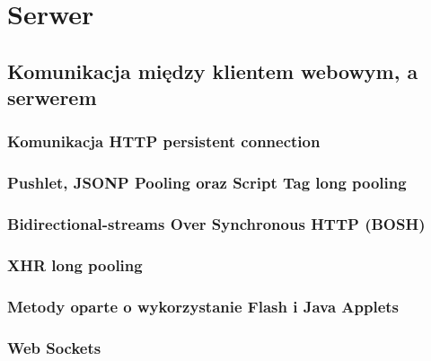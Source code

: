 \section{Serwer}


\subsection{Komunikacja między klientem webowym, a serwerem}


\subsubsection{Komunikacja HTTP persistent connection}


\subsubsection{Pushlet, JSONP Pooling oraz Script Tag long pooling}


\subsubsection{Bidirectional-streams Over Synchronous HTTP (BOSH)}


\subsubsection{XHR long pooling}


\subsubsection{Metody oparte o wykorzystanie Flash i Java Applets}

% 

\subsubsection{Web Sockets}

